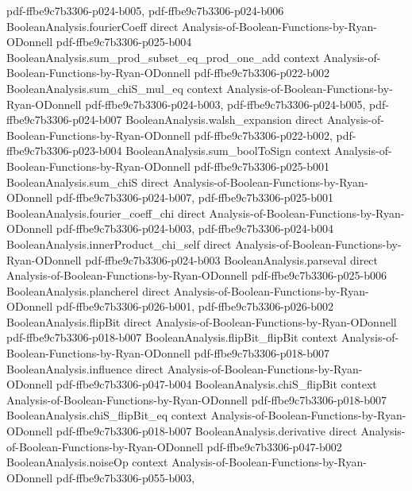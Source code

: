 \begin{theorem}
  {pdf-ffbe9c7b3306-p024-b005,
    pdf-ffbe9c7b3306-p024-b006}
\proofstep
  {BooleanAnalysis.fourierCoeff}
  {direct}
  {Analysis-of-Boolean-Functions-by-Ryan-ODonnell}
  {pdf-ffbe9c7b3306-p025-b004}
\proofstep
  {BooleanAnalysis.sum_prod_subset_eq_prod_one_add}
  {context}
  {Analysis-of-Boolean-Functions-by-Ryan-ODonnell}
  {pdf-ffbe9c7b3306-p022-b002}
\proofstep
  {BooleanAnalysis.sum_chiS_mul_eq}
  {context}
  {Analysis-of-Boolean-Functions-by-Ryan-ODonnell}
  {pdf-ffbe9c7b3306-p024-b003,
    pdf-ffbe9c7b3306-p024-b005,
    pdf-ffbe9c7b3306-p024-b007}
\proofstep
  {BooleanAnalysis.walsh_expansion}
  {direct}
  {Analysis-of-Boolean-Functions-by-Ryan-ODonnell}
  {pdf-ffbe9c7b3306-p022-b002,
    pdf-ffbe9c7b3306-p023-b004}
\proofstep
  {BooleanAnalysis.sum_boolToSign}
  {context}
  {Analysis-of-Boolean-Functions-by-Ryan-ODonnell}
  {pdf-ffbe9c7b3306-p025-b001}
\proofstep
  {BooleanAnalysis.sum_chiS}
  {direct}
  {Analysis-of-Boolean-Functions-by-Ryan-ODonnell}
  {pdf-ffbe9c7b3306-p024-b007,
    pdf-ffbe9c7b3306-p025-b001}
\proofstep
  {BooleanAnalysis.fourier_coeff_chi}
  {direct}
  {Analysis-of-Boolean-Functions-by-Ryan-ODonnell}
  {pdf-ffbe9c7b3306-p024-b003,
    pdf-ffbe9c7b3306-p024-b004}
\proofstep
  {BooleanAnalysis.innerProduct_chi_self}
  {direct}
  {Analysis-of-Boolean-Functions-by-Ryan-ODonnell}
  {pdf-ffbe9c7b3306-p024-b003}
\proofstep
  {BooleanAnalysis.parseval}
  {direct}
  {Analysis-of-Boolean-Functions-by-Ryan-ODonnell}
  {pdf-ffbe9c7b3306-p025-b006}
\proofstep
  {BooleanAnalysis.plancherel}
  {direct}
  {Analysis-of-Boolean-Functions-by-Ryan-ODonnell}
  {pdf-ffbe9c7b3306-p026-b001,
    pdf-ffbe9c7b3306-p026-b002}
\proofstep
  {BooleanAnalysis.flipBit}
  {direct}
  {Analysis-of-Boolean-Functions-by-Ryan-ODonnell}
  {pdf-ffbe9c7b3306-p018-b007}
\proofstep
  {BooleanAnalysis.flipBit_flipBit}
  {context}
  {Analysis-of-Boolean-Functions-by-Ryan-ODonnell}
  {pdf-ffbe9c7b3306-p018-b007}
\proofstep
  {BooleanAnalysis.influence}
  {direct}
  {Analysis-of-Boolean-Functions-by-Ryan-ODonnell}
  {pdf-ffbe9c7b3306-p047-b004}
\proofstep
  {BooleanAnalysis.chiS_flipBit}
  {context}
  {Analysis-of-Boolean-Functions-by-Ryan-ODonnell}
  {pdf-ffbe9c7b3306-p018-b007}
\proofstep
  {BooleanAnalysis.chiS_flipBit_eq}
  {context}
  {Analysis-of-Boolean-Functions-by-Ryan-ODonnell}
  {pdf-ffbe9c7b3306-p018-b007}
\proofstep
  {BooleanAnalysis.derivative}
  {direct}
  {Analysis-of-Boolean-Functions-by-Ryan-ODonnell}
  {pdf-ffbe9c7b3306-p047-b002}
\proofstep
  {BooleanAnalysis.noiseOp}
  {context}
  {Analysis-of-Boolean-Functions-by-Ryan-ODonnell}
  {pdf-ffbe9c7b3306-p055-b003,
}
\end{theorem}
